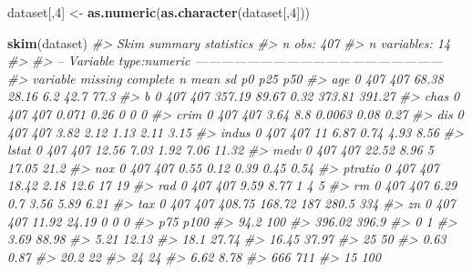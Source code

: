 \documentclass[]{book}
\newenvironment{Shaded}{\begin{snugshade}}{\end{snugshade}}
\newcommand{\CommentTok}[1]{\textcolor[rgb]{0.56,0.35,0.01}{\textit{#1}}}
\newcommand{\DecValTok}[1]{\textcolor[rgb]{0.00,0.00,0.81}{#1}}
\newcommand{\KeywordTok}[1]{\textcolor[rgb]{0.13,0.29,0.53}{\textbf{#1}}}
\newcommand{\NormalTok}[1]{#1}
\newcommand{\StringTok}[1]{\textcolor[rgb]{0.31,0.60,0.02}{#1}}
\begin{document}
\begin{Shaded}
\begin{Highlighting}[]
\NormalTok{dataset[,}\DecValTok{4}\NormalTok{] <-}\StringTok{ }\KeywordTok{as.numeric}\NormalTok{(}\KeywordTok{as.character}\NormalTok{(dataset[,}\DecValTok{4}\NormalTok{]))}
\end{Highlighting}
\end{Shaded}

\begin{Shaded}
\begin{Highlighting}[]
\KeywordTok{skim}\NormalTok{(dataset)}
\CommentTok{#> Skim summary statistics}
\CommentTok{#>  n obs: 407 }
\CommentTok{#>  n variables: 14 }
\CommentTok{#> }
\CommentTok{#> -- Variable type:numeric ---------------------------------------------------------}
\CommentTok{#>  variable missing complete   n    mean     sd       p0    p25    p50}
\CommentTok{#>       age       0      407 407  68.38   28.16   6.2     42.7   77.3 }
\CommentTok{#>         b       0      407 407 357.19   89.67   0.32   373.81 391.27}
\CommentTok{#>      chas       0      407 407   0.071   0.26   0        0      0   }
\CommentTok{#>      crim       0      407 407   3.64    8.8    0.0063   0.08   0.27}
\CommentTok{#>       dis       0      407 407   3.82    2.12   1.13     2.11   3.15}
\CommentTok{#>     indus       0      407 407  11       6.87   0.74     4.93   8.56}
\CommentTok{#>     lstat       0      407 407  12.56    7.03   1.92     7.06  11.32}
\CommentTok{#>      medv       0      407 407  22.52    8.96   5       17.05  21.2 }
\CommentTok{#>       nox       0      407 407   0.55    0.12   0.39     0.45   0.54}
\CommentTok{#>   ptratio       0      407 407  18.42    2.18  12.6     17     19   }
\CommentTok{#>       rad       0      407 407   9.59    8.77   1        4      5   }
\CommentTok{#>        rm       0      407 407   6.29    0.7    3.56     5.89   6.21}
\CommentTok{#>       tax       0      407 407 408.75  168.72 187      280.5  334   }
\CommentTok{#>        zn       0      407 407  11.92   24.19   0        0      0   }
\CommentTok{#>     p75   p100}
\CommentTok{#>   94.2  100   }
\CommentTok{#>  396.02 396.9 }
\CommentTok{#>    0      1   }
\CommentTok{#>    3.69  88.98}
\CommentTok{#>    5.21  12.13}
\CommentTok{#>   18.1   27.74}
\CommentTok{#>   16.45  37.97}
\CommentTok{#>   25     50   }
\CommentTok{#>    0.63   0.87}
\CommentTok{#>   20.2   22   }
\CommentTok{#>   24     24   }
\CommentTok{#>    6.62   8.78}
\CommentTok{#>  666    711   }
\CommentTok{#>   15    100}
\end{Highlighting}
\end{Shaded}
\end{document}
